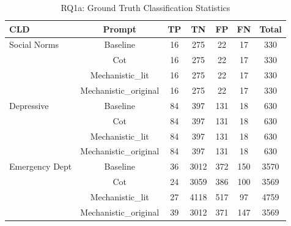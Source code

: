 \begin{table}[htbp]
\centreing
\caption{RQ1a: Ground Truth Classification Statistics}
\label{tab:rq1a_gt_classification}
\begin{tabular}{lcccccc}
\toprule
\textbf{CLD} & \textbf{Prompt} & \textbf{TP} & \textbf{TN} & \textbf{FP} & \textbf{FN} & \textbf{Total} \\
\midrule
Social Norms & Baseline & 16 & 275 & 22 & 17 & 330 \\
 & Cot & 16 & 275 & 22 & 17 & 330 \\
 & Mechanistic_lit & 16 & 275 & 22 & 17 & 330 \\
 & Mechanistic_original & 16 & 275 & 22 & 17 & 330 \\
\midrule
Depressive & Baseline & 84 & 397 & 131 & 18 & 630 \\
 & Cot & 84 & 397 & 131 & 18 & 630 \\
 & Mechanistic_lit & 84 & 397 & 131 & 18 & 630 \\
 & Mechanistic_original & 84 & 397 & 131 & 18 & 630 \\
\midrule
Emergency Dept & Baseline & 36 & 3012 & 372 & 150 & 3570 \\
 & Cot & 24 & 3059 & 386 & 100 & 3569 \\
 & Mechanistic_lit & 27 & 4118 & 517 & 97 & 4759 \\
 & Mechanistic_original & 39 & 3012 & 371 & 147 & 3569 \\
\midrule
\bottomrule
\end{tabular}
\end{table}